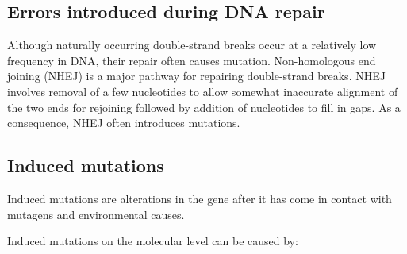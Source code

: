 \hypertarget{errors-introduced-during-dna-repair}{%
\subsection{Errors introduced during DNA repair}\label{errors-introduced-during-dna-repair}}

Although naturally occurring double-strand breaks occur at a relatively low frequency in DNA, their repair often causes mutation. Non-homologous end joining (NHEJ) is a major pathway for repairing double-strand breaks. NHEJ involves removal of a few nucleotides to allow somewhat inaccurate alignment of the two ends for rejoining followed by addition of nucleotides to fill in gaps. As a consequence, NHEJ often introduces mutations.

\hypertarget{induced-mutations}{%
\subsection{Induced mutations}\label{induced-mutations}}

Induced mutations are alterations in the gene after it has come in contact with mutagens and environmental causes.

Induced mutations on the molecular level can be caused by:

